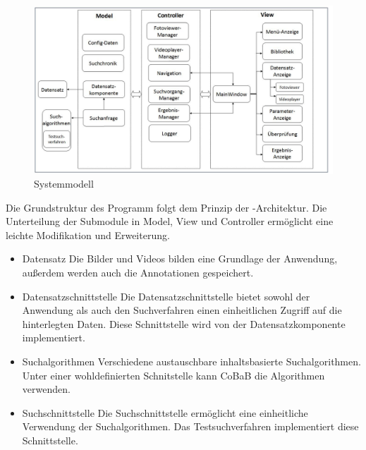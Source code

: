 \begin{figure}[h]
\includegraphics[width=1\linewidth]{img/sysmodell}
\caption{Systemmodell}
\label{fig:systemmodell}
\end{figure}
\vspace{10pt}

Die Grundstruktur des Programm folgt dem Prinzip der -Architektur. Die Unterteilung der Submodule in Model, View und Controller ermöglicht eine leichte Modifikation und Erweiterung.

\begin{itemize}
\item Datensatz\newline
Die Bilder und Videos bilden eine Grundlage der Anwendung, außerdem werden auch die Annotationen gespeichert.
\item Datensatzschnittstelle\newline
Die Datensatzschnittstelle bietet sowohl der Anwendung als auch den Suchverfahren einen einheitlichen Zugriff auf die hinterlegten Daten. Diese Schnittstelle wird von der Datensatzkomponente implementiert.
\item Suchalgorithmen\newline
Verschiedene austauschbare inhaltsbasierte Suchalgorithmen. Unter einer wohldefinierten Schnitstelle kann CoBaB die Algorithmen verwenden.
\item Suchschnittstelle\newline
Die Suchschnittstelle ermöglicht eine einheitliche Verwendung der Suchalgorithmen. Das Testsuchverfahren implementiert diese Schnittstelle.
\end{itemize}

